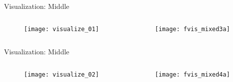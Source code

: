 \begin{frame}{Visualization: Middle}

  \begin{columns}
    \begin{column}{0.1\textwidth}
      \begin{figure}
        \texttt{[image: visualize\_01]}
      \end{figure}
    \end{column}
    \begin{column}{0.9\textwidth}
      \begin{figure}
        \texttt{[image: fvis\_mixed3a]}
      \end{figure}
    \end{column}
  \end{columns}

  \note{
    \begin{itemize}
      \item
      \item
    \end{itemize}
  }
\end{frame}


\begin{frame}{Visualization: Middle}

  \begin{columns}
    \begin{column}{0.1\textwidth}
      \begin{figure}
        \texttt{[image: visualize\_02]}
      \end{figure}
    \end{column}
    \begin{column}{0.9\textwidth}
      \begin{figure}
        \texttt{[image: fvis\_mixed4a]}
      \end{figure}
    \end{column}
  \end{columns}

  \note{
    \begin{itemize}
      \item
      \item
    \end{itemize}
  }
\end{frame}


